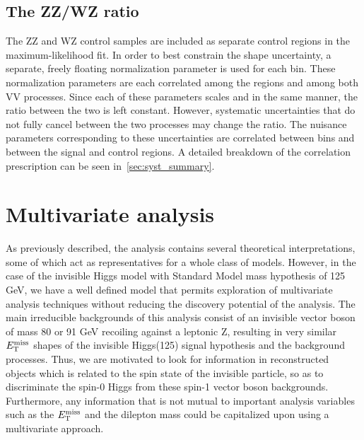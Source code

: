 \subsection{The ZZ/WZ ratio}
The ZZ and WZ control samples are included as separate control regions in the maximum-likelihood fit.
In order to best constrain the shape uncertainty, a separate, freely floating normalization parameter is used for each \met bin.
These normalization parameters are each correlated among the regions and among both VV processes.
Since each of these parameters scales \WZ and \ZZ in the same manner, the ratio between the two is left constant.
However, systematic uncertainties that do not fully cancel between the two processes may change the ratio.
The nuisance parameters corresponding to these uncertainties are correlated between \met bins and between the signal and control regions.
A detailed breakdown of the correlation prescription can be seen in~\ref{sec:syst_summary}. 

\section{Multivariate analysis}

As previously described, the analysis contains several theoretical interpretations, some of which act as representatives for a whole class of models.
However, in the case of the invisible Higgs model with Standard Model mass hypothesis of 125 GeV, we have a well defined model
that permits exploration of multivariate analysis techniques without reducing the discovery potential of the analysis.
The main irreducible backgrounds of this analysis consist of an invisible vector boson of mass 80 or 91 GeV recoiling against a leptonic Z, resulting in very similar 
$E_\mathrm{T}^{\mathrm{miss}}$ shapes of the invisible Higgs(125) signal hypothesis and the background processes. Thus, we are motivated to look for information in reconstructed objects
which is related to the spin state of the invisible particle, so as to discriminate the spin-0 Higgs from these spin-1 vector boson backgrounds.
Furthermore, any information that is not mutual to important analysis variables such as the $E_\mathrm{T}^{\mathrm{miss}}$ and the dilepton mass could be capitalized upon using a multivariate approach.


